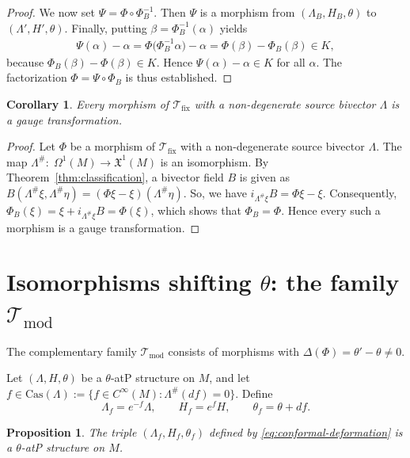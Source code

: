 \documentclass[11pt,a4paper]{article}
\theoremstyle{plain}
\newtheorem{proposition}[theorem]{Proposition}
\newtheorem{corollary}[theorem]{Corollary}
\theoremstyle{definition}
\theoremstyle{remark}
\begin{document}
\begin{proof}
	We now set $\Psi=\Phi\circ\Phi_B^{-1}$. Then $\Psi$ is a morphism from $(\Lambda_B,H_B,\theta)$
	to $(\Lambda',H',\theta)$. Finally, putting $\beta=\Phi_B^{-1}(\alpha)$ yields
	\begin{align*}
		\Psi(\alpha)-\alpha
		= \Phi\bigl(\Phi_B^{-1}\alpha\bigr)-\alpha = \Phi(\beta)-\Phi_B(\beta) \in K,
	\end{align*}
	because $\Phi_B(\beta)-\Phi(\beta)\in K$. Hence $\Psi(\alpha)-\alpha\in K$ for all $\alpha$.
	The factorization $\Phi=\Psi\circ\Phi_B$ is thus established.
\end{proof}

 \begin{corollary}
 	Every morphism of  $\mathcal{T}_{\mathrm{fix}}$ with a non-degenerate source bivector $\Lambda$ is a gauge transformation.
 \end{corollary}

 \begin{proof} Let $\Phi$  be a morphism of  $\mathcal{T}_{\mathrm{fix}}$ with a non-degenerate source bivector $\Lambda$.
 	The map  $\Lambda^\#:\; \Omega^1(M) \rightarrow \mathfrak{X}^1(M)$ is an isomorphism. By Theorem~\ref{thm:classification},  a bivector field  $B$ is given as
 	$B(\Lambda^\# \xi, \Lambda^\# \eta) = (\Phi \xi - \xi)(\Lambda^\# \eta)$. So, we have $i_{\Lambda^\# \xi} B = \Phi \xi - \xi$. Consequently,
 	$\Phi_B(\xi) = \xi + i_{\Lambda^\# \xi} B = \Phi(\xi)$,
 	which shows that $\Phi_B = \Phi$. Hence every such a morphism is a gauge transformation.
 \end{proof}





\section{Isomorphisms shifting $\theta$: the family $\mathcal{T}_{\mathrm{mod}}$}
\label{sec:Tmod}
The complementary family $\mathcal{T}_{\mathrm{mod}}$ consists of morphisms with $\Delta(\Phi) = \theta' - \theta \neq 0$. 

Let $(\Lambda, H, \theta)$ be a $\theta$-atP structure on $M$, and let $f \in \mathrm{Cas}(\Lambda) := \{f \in C^\infty(M) : \Lambda^\#(df) = 0\}$. Define
\begin{equation}\label{eq:conformal-deformation}
	\Lambda_f = e^{-f}\Lambda, \qquad
	H_f = e^f H, \qquad
	\theta_f = \theta + df.
\end{equation}

\begin{proposition}\label{prop:struct}
	The triple $(\Lambda_f, H_f, \theta_f)$ defined by \eqref{eq:conformal-deformation} is a $\theta$-atP structure on $M$.
\end{proposition}
\end{document}
